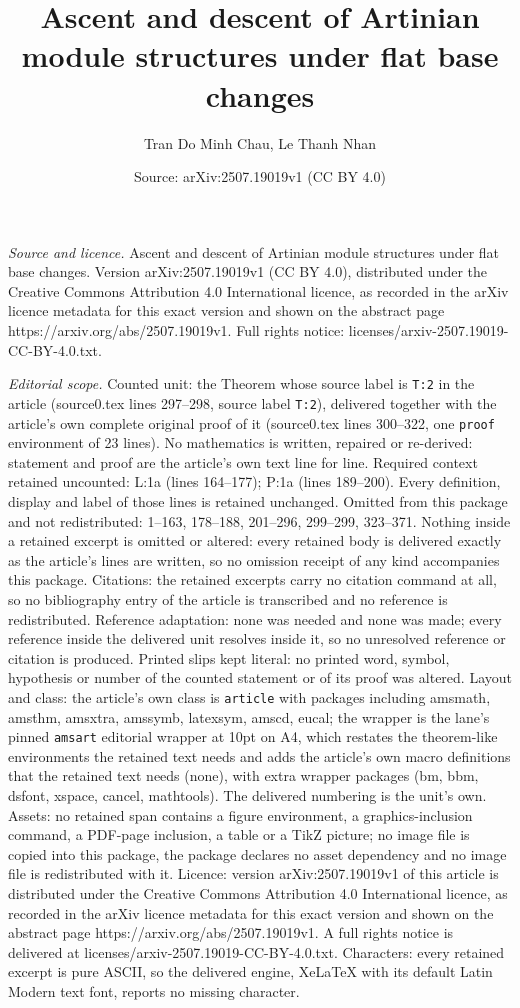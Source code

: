 \documentclass[10pt,a4paper]{amsart}
\title[Ascent and descent of Artinian module structures under flat ]{Ascent and descent of Artinian module structures under flat base changes}
\author{Tran Do Minh Chau, Le Thanh Nhan}
\date{Source: arXiv:2507.19019v1 (CC BY 4.0)}
\begin{document}
\maketitle

\noindent\emph{Source and licence.} Ascent and descent of Artinian module structures under flat base changes. Version arXiv:2507.19019v1 (CC BY 4.0), distributed under the Creative Commons Attribution 4.0 International licence, as recorded in the arXiv licence metadata for this exact version and shown on the abstract page https://arxiv.org/abs/2507.19019v1. Full rights notice: licenses/arxiv-2507.19019-CC-BY-4.0.txt.\par\smallskip

\noindent\textit{Editorial scope.} Counted unit: the Theorem whose source label is \texttt{T:2} in the article (source0.tex lines 297--298, source label \texttt{T:2}), delivered together with the article's own complete original proof of it (source0.tex lines 300--322, one \texttt{proof} environment of 23 lines). No mathematics is written, repaired or re-derived: statement and proof are the article's own text line for line. Required context retained uncounted: L:1a (lines 164--177); P:1a (lines 189--200). Every definition, display and label of those lines is retained unchanged. Omitted from this package and not redistributed: 1--163, 178--188, 201--296, 299--299, 323--371. Nothing inside a retained excerpt is omitted or altered: every retained body is delivered exactly as the article's lines are written, so no omission receipt of any kind accompanies this package. Citations: the retained excerpts carry no citation command at all, so no bibliography entry of the article is transcribed and no reference is redistributed. Reference adaptation: none was needed and none was made; every reference inside the delivered unit resolves inside it, so no unresolved reference or citation is produced. Printed slips kept literal: no printed word, symbol, hypothesis or number of the counted statement or of its proof was altered. Layout and class: the article's own class is \texttt{article} with packages including amsmath, amsthm, amsxtra, amssymb, latexsym, amscd, eucal; the wrapper is the lane's pinned \texttt{amsart} editorial wrapper at 10pt on A4, which restates the theorem-like environments the retained text needs and adds the article's own macro definitions that the retained text needs (none), with extra wrapper packages (bm, bbm, dsfont, xspace, cancel, mathtools). The delivered numbering is the unit's own. Assets: no retained span contains a figure environment, a graphics-inclusion command, a PDF-page inclusion, a table or a TikZ picture; no image file is copied into this package, the package declares no asset dependency and no image file is redistributed with it. Licence: version arXiv:2507.19019v1 of this article is distributed under the Creative Commons Attribution 4.0 International licence, as recorded in the arXiv licence metadata for this exact version and shown on the abstract page https://arxiv.org/abs/2507.19019v1. A full rights notice is delivered at licenses/arxiv-2507.19019-CC-BY-4.0.txt. Characters: every retained excerpt is pure ASCII, so the delivered engine, XeLaTeX with its default Latin Modern text font, reports no missing character.
\end{document}
